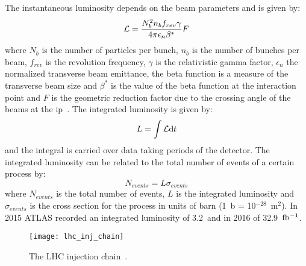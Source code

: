 The instantaneous luminosity depends on the beam parameters and is given by:
\begin{equation}
  \label{eq:70}
  \mathcal{L} = \frac{N^2_b n_b f_{rev} \gamma}{4 \pi \epsilon_n \beta^*} F
\end{equation}
where $N_b$ is the number of particles per bunch, $n_b$ is the number of bunches
per beam, $f_{rev}$ is the revolution frequency, $\gamma$ is the relativistic
gamma factor, $\epsilon_n$ the normalized transverse beam emittance, the beta
function is a measure of the transverse beam size and $\beta^*$ is the value of
the beta function at the interaction point and $F$ is the geometric reduction
factor due to the crossing angle of the beams at the \gls{ip}~\cite{LHC}. The
integrated luminosity is given by:
\begin{equation}
  \label{eq:71}
  L = \int \mathcal{L} \mathrm{d} t
\end{equation}
and the integral is carried over data taking periods of the detector. The
integrated luminosity can be related to the total number of events of a certain
process by:
\begin{equation}
  \label{eq:72}
  N_{events} = L \sigma_{events}
\end{equation}
where $N_{events}$ is the total number of events, $L$ is the integrated
luminosity and $\sigma_{events}$ is the cross section for the process in units
of barn (1~b = 10$^{-28}$~m$^2$). In 2015 ATLAS recorded an integrated
luminosity of 3.2~\ifb and in 2016 of 32.9~$\mbox{fb$^{-1}$}$.
\begin{figure}[!h]
  \centering
    \texttt{[image: lhc\_inj\_chain]}
    \caption{The LHC injection chain~\cite{LHCFAQ}.}
    \label{fig:lhc_inj_chain}
\end{figure}
